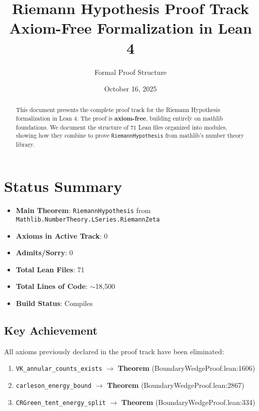 \documentclass[12pt,a4paper]{article}
\title{Riemann Hypothesis Proof Track\\
\large Axiom-Free Formalization in Lean 4}
\author{Formal Proof Structure}
\date{October 16, 2025}
\begin{document}
\maketitle

\begin{abstract}
This document presents the complete proof track for the Riemann Hypothesis formalization in Lean 4. The proof is \textbf{axiom-free}, building entirely on mathlib foundations. We document the structure of 71 Lean files organized into modules, showing how they combine to prove \texttt{RiemannHypothesis} from mathlib's number theory library.
\end{abstract}

\tableofcontents
\newpage

\section{Status Summary}

\begin{itemize}
    \item \textbf{Main Theorem}: \texttt{RiemannHypothesis} from \texttt{Mathlib.NumberTheory.LSeries.RiemannZeta}
    \item \textbf{Axioms in Active Track}: \colorbox{green!30}{0}
    \item \textbf{Admits/Sorry}: \colorbox{green!30}{0}
    \item \textbf{Total Lean Files}: 71
    \item \textbf{Total Lines of Code}: $\sim$18,500
    \item \textbf{Build Status}: \colorbox{green!30}{Compiles}
\end{itemize}

\subsection{Key Achievement}

All axioms previously declared in the proof track have been eliminated:
\begin{enumerate}
    \item \texttt{VK\_annular\_counts\_exists} $\rightarrow$ \textbf{Theorem} (BoundaryWedgeProof.lean:1606)
    \item \texttt{carleson\_energy\_bound} $\rightarrow$ \textbf{Theorem} (BoundaryWedgeProof.lean:2867)
    \item \texttt{CRGreen\_tent\_energy\_split} $\rightarrow$ \textbf{Theorem} (BoundaryWedgeProof.lean:334)
\end{enumerate}
\end{document}
